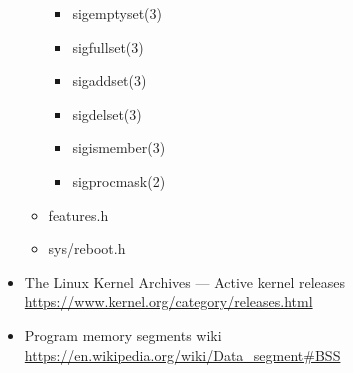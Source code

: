 \documentclass{article}
\begin{document}
\begin{itemize}
\begin{itemize}
\begin{itemize}
                    \item sigemptyset(3)
                    \item sigfullset(3)
                    \item sigaddset(3)
                    \item sigdelset(3)
                    \item sigismember(3)

                    \item sigprocmask(2)
                \end{itemize}
            \item features.h
            \item sys/reboot.h
        \end{itemize}
    \item The Linux Kernel Archives --- Active kernel releases \url{https://www.kernel.org/category/releases.html}
    \item Program memory segments wiki
          \url{https://en.wikipedia.org/wiki/Data_segment#BSS}
\end{itemize}
%
\end{document}
